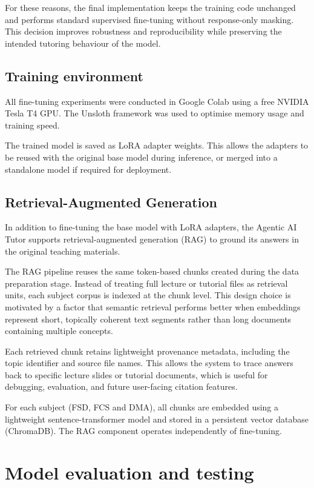 For these reasons, the final implementation keeps the training code unchanged and performs standard supervised fine-tuning without response-only masking. This decision improves robustness and reproducibility while preserving the intended tutoring behaviour of the model.

\subsection{Training environment}

All fine-tuning experiments were conducted in Google Colab using a free NVIDIA Tesla T4 GPU. The Unsloth framework was used to optimise memory usage and training speed.

The trained model is saved as LoRA adapter weights. This allows the adapters to be reused with the original base model during inference, or merged into a standalone model if required for deployment.

\subsection{Retrieval-Augmented Generation}

In addition to fine-tuning the base model with LoRA adapters, the Agentic AI Tutor supports retrieval-augmented generation (RAG) to ground its answers in the original teaching materials.

The RAG pipeline reuses the same token-based chunks created during the data preparation stage. Instead of treating full lecture or tutorial files as retrieval units, each subject corpus is indexed at the chunk level. This design choice is motivated by a factor that semantic retrieval performs better when embeddings represent short, topically coherent text segments rather than long documents containing multiple concepts.

Each retrieved chunk retains lightweight provenance metadata, including the topic identifier and source file names. This allows the system to trace answers back to specific lecture slides or tutorial documents, which is useful for debugging, evaluation, and future user-facing citation features.

For each subject (FSD, FCS and DMA), all chunks are embedded using a lightweight sentence-transformer model and stored in a persistent vector database (ChromaDB). The RAG component operates independently of fine-tuning.

\section{Model evaluation and testing}

